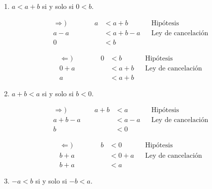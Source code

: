 \documentclass[11pt]{article}
\begin{document}
\begin{enumerate}[label=\alph*)]
\begin{enumerate}[label=\roman*)]
  \item $a<a+b$ si y solo si $0<b$.
  \begin{center}\vspace{-1em}
  \begin{minipage}[l]{.5\linewidth}
   \begin{align*}
    \Rightarrow) \qquad \qquad
    a &< a + b && \text{Hipótesis}\\
    a -a &< a + b - a && \text{Ley de cancelación}\\
    0 &< b%
   \end{align*}
  \end{minipage}%
  \begin{minipage}[r]{.5\linewidth}
   \begin{align*}
    \Leftarrow) \qquad \qquad
    0 &< b && \text{Hipótesis}\\
    0 + a &< a + b && \text{Ley de cancelación}\\
    a &< a + b%
   \end{align*}
  \end{minipage}
  \end{center}
  \item $a+b<a$ si y solo si $b<0$.
  \begin{center}\vspace{-1em}
  \begin{minipage}[l]{.5\linewidth}
   \begin{align*} \Rightarrow) \qquad \qquad
    a+b &< a && \text{Hipótesis}\\
    a+b-a &< a-a && \text{Ley de cancelación}\\
    b &< 0%
   \end{align*}
  \end{minipage}%
  \begin{minipage}[r]{.5\linewidth}
   \begin{align*} \Leftarrow) \qquad \qquad
    b &< 0 && \text{Hipótesis}\\
    b + a &< 0 + a && \text{Ley de cancelación}\\
    b+ a &< a%
   \end{align*}
  \end{minipage}
  \end{center}
  \item $-a<b$ si y solo si $-b<a$.
  \begin{center}\vspace{-1em}
  \begin{minipage}[l]{.5\linewidth}

\end{minipage}
\end{center}
\end{enumerate}
\end{enumerate}
\end{document}
